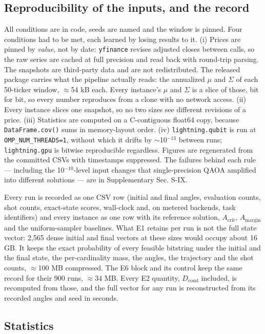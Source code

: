\documentclass[journal]{IEEEtran}
\begin{document}
\subsection{Reproducibility of the inputs, and the record}


All conditions are in code, seeds are named and the window is pinned. Four conditions had to be met, each learned by losing results to it. (i) Prices are pinned by \textit{value}, not by date: \texttt{yfinance} revises adjusted closes between calls, so the raw series are cached at full precision and read back with round-trip parsing. The snapshots are third-party data and are not redistributed. The released package carries what the pipeline actually reads: the annualized $\mu$ and $\Sigma$ of each 50-ticker window, $\approx$54 kB each. Every instance's $\mu$ and $\Sigma$ is a slice of those, bit for bit, so every number reproduces from a clone with no network access. (ii) Every instance slices one snapshot, so no two sizes see different revisions of a price. (iii) Statistics are computed on a C-contiguous float64 copy, because \texttt{DataFrame.cov()} sums in memory-layout order. (iv) \texttt{lightning.qubit} is run at \texttt{OMP\_NUM\_THREADS=1}, without which it drifts by $\sim$10$^{-13}$ between runs; \texttt{lightning.gpu} is bitwise reproducible regardless. Figures are regenerated from the committed CSVs with timestamps suppressed. The failures behind each rule --- including the 10$^{-10}$-level input changes that single-precision QAOA amplified into different solutions --- are in Supplementary Sec. S-IX.


Every run is recorded as one CSV row (initial and final angles, evaluation counts, shot counts, exact-state scores, wall-clock and, on metered backends, task identifiers) and every instance as one row with its reference solution, $A_{\mathrm{crit}}$, $A_{\mathrm{margin}}$ and the uniform-sampler baselines. What E1 retains per run is not the full state vector: 2,565 dense initial and final vectors at these sizes would occupy about 16 GB. It keeps the exact probability of every feasible bitstring under the initial and the final state, the per-cardinality mass, the angles, the trajectory and the shot counts, $\approx$100 MB compressed. The E6 block and its control keep the same record for their 900 runs, $\approx$34 MB. Every E2 quantity, $D_{\mathrm{cond}}$ included, is recomputed from those, and the full vector for any run is reconstructed from its recorded angles and seed in seconds.


\subsection{Statistics}
\end{document}
